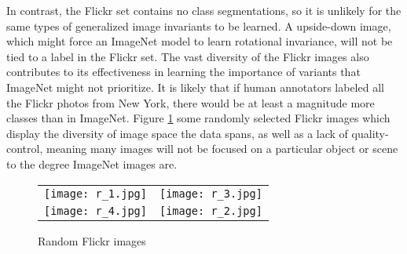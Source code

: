 In contrast, the Flickr set contains no class segmentations, so it is unlikely for the same types of generalized image invariants to be learned. A upside-down image, which might force an ImageNet model to learn rotational invariance, will not be tied to a label in the Flickr set. The vast diversity of the Flickr images also contributes to its effectiveness in learning the importance of variants that ImageNet might not prioritize. It is likely that if human annotators labeled all the Flickr photos from New York, there would be at least a magnitude more classes than in ImageNet. Figure \ref{fig:example_flickr} some randomly selected Flickr images which display the diversity of image space the data spans, as well as a lack of quality-control, meaning many images will not be focused on a particular object or scene to the degree ImageNet images are.

\begin{figure}[!htbp]
	\centering
	\begin{tabular}{cc}
		\texttt{[image: r\_1.jpg]}  &       
		\texttt{[image: r\_3.jpg]}  \\
		\texttt{[image: r\_4.jpg]}  &       
		\texttt{[image: r\_2.jpg]} \\

	\end{tabular}
	\label{fig:example_flickr}
	\caption{Random Flickr images}
\end{figure}





